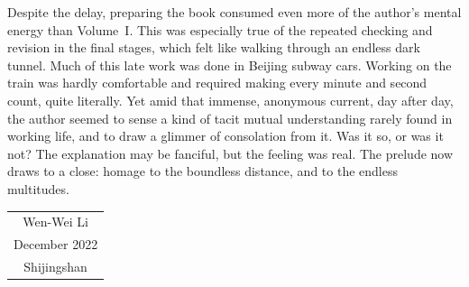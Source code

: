 Despite the delay, preparing the book consumed even more of the author's mental energy than Volume~I. This was especially true of the repeated checking and revision in the final stages, which felt like walking through an endless dark tunnel. Much of this late work was done in Beijing subway cars. Working on the train was hardly comfortable and required making every minute and second count, quite literally. Yet amid that immense, anonymous current, day after day, the author seemed to sense a kind of tacit mutual understanding rarely found in working life, and to draw a glimmer of consolation from it. Was it so, or was it not? The explanation may be fanciful, but the feeling was real. The prelude now draws to a close: homage to the boundless distance, and to the endless multitudes.

\vspace{1em}
\begin{flushright}\begin{minipage}{0.3 \textwidth}
	\begin{tabular}{c}
		{\fangsong Wen-Wei Li} \\
		December 2022 \\
		Shijingshan
	\end{tabular}
\end{minipage}\end{flushright}
